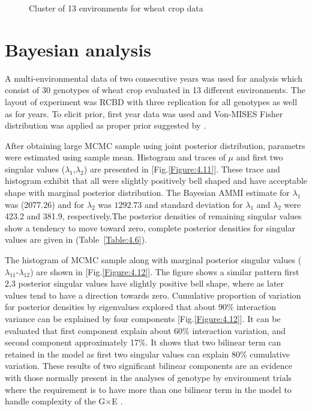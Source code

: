 \begin{figure} [H]
	\caption[Cluster analysis of environments]{Cluster of 13 environments for wheat crop data}
\label{Figure:4.10}
\end{figure}


\section{Bayesian analysis}
A multi-environmental data of two consecutive years was used for analysis which consist of 30 genotypes of wheat crop evaluated in 13 different environments. The layout of experiment was RCBD with three replication for all genotypes as well as for years. To elicit prior, first year data was used and Von-MISES Fisher distribution was applied as proper prior suggested by \citep{PEREZ-ELIZALDE2011}.

 After obtaining large MCMC sample using joint posterior distribution, parametrs were estimated using sample mean. Histogram and traces of $\mu$ and first two singular values ($\lambda_1$,$\lambda_2$) are presented in [Fig.\ref{Figure:4.11}]. These trace and histogram exhibit  that all were slightly positively bell shaped and have acceptable shape with marginal posterior distribution. The Bayesian AMMI estimate for $\lambda_1$ was (2077.26) and for $\lambda_2$ was $1292.73$ and standard deviation for $\lambda_1$ and $\lambda_2$ were 423.2 and 381.9, respectively.The posterior densities of remaining singular values show a tendency to move toward zero, complete posterior densities for singular values are given in (Table~\ref{Table:4.6}).

The histogram of MCMC sample along with marginal posterior singular values ($\lambda_{11}$-$\lambda_{12}$) are shown in [Fig.\ref{Figure:4.12}]. The figure shows a similar pattern first 2,3  posterior singular values have slightly positive bell shape, where as later values tend to have a direction towards zero. Cumulative proportion of variation for posterior densities by eigenvalues explored that about 90\% interaction variance can be explained by four components [Fig.\ref{Figure:4.12}]. It can be evaluated that first component explain about 60\% interaction variation, and second component approximately 17\%. It shows that  two bilinear term can retained in the model as  first two singular values can explain 80\% cumulative variation.  These results of two significant bilinear components are an evidence  with those normally present in the analyses of genotype by environment trials where the requirement  is to have more than one bilinear term in the model to  handle complexity of the G$\times$E \citep{PEREZ-ELIZALDE2011}.

